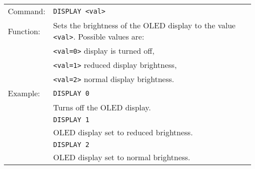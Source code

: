 \begin{table}[!htbp]
  \begin{tabularx}{\textwidth}{lX}
    Command:  & \texttt{DISPLAY <val>}\\
    Function: & Sets the brightness of the OLED display to the value \texttt{<val>}. Possible values are:\\
              & \texttt{<val=0>} display is turned off, \\
              & \texttt{<val=1>} reduced display brightness, \\
              & \texttt{<val=2>} normal display brightness. \\
    Example:  & \texttt{DISPLAY 0}\\
              & Turns off the OLED display.\\
              & \texttt{DISPLAY 1}\\
              & OLED display set to reduced brightness.\\
              & \texttt{DISPLAY 2}\\
              & OLED display set to normal brightness.\\
  \end{tabularx}
\end{table}



